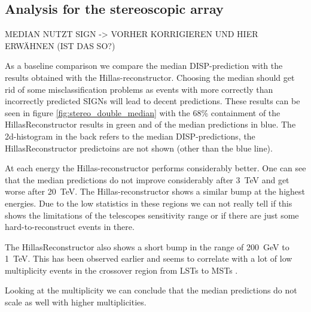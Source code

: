 \subsection{Analysis for the stereoscopic array}
MEDIAN NUTZT SIGN -> VORHER KORRIGIEREN UND HIER ERWÄHNEN (IST DAS SO?)

As a baseline comparison we compare the median DISP-prediction 
with the results obtained with the Hillas-reconstructor.
Choosing the median should get rid of some misclassification 
problems as events with more correctly than incorrectly 
predicted SIGNs will lead to decent predictions.
These results can be seen in figure \ref{fig:stereo_double_median}
with the 68\% containment of the HillasReconstructor results in green 
and of the median predictions in blue.
The 2d-histogram in the back refers to the median DISP-predictions,
the HillasReconstructor predictoins are not shown (other than the blue line).

At each energy the Hillas-reconstructor performs considerably better.
One can see that the median predictions do not improve considerably after
\SI{3}{\tera\electronvolt} and get worse after \SI{20}{\tera\electronvolt}.
The Hillas-reconstructor shows a similar bump at the highest energies.
Due to the low statistics in these regions we can not really tell 
if this shows the limitations of the telescopes sensitivity range 
or if there are just some hard-to-reconstruct events in there. 

The HillasReconstructor also shows a short bump in the range of \SI{200}{\giga\electronvolt}
to \SI{1}{\tera\electronvolt}. 
This has been observed earlier and seems to correlate with 
a lot of low multiplicity events in the crossover region from LSTs to MSTs \cite{????}.

Looking at the multiplicity we can conclude that the median predictions
do not scale as well with higher multiplicities.

